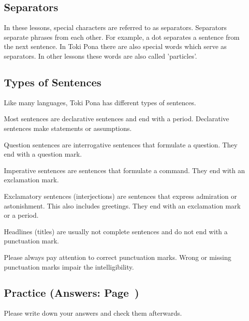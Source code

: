 \subsection*{Separators}
In these lessons, special characters are referred to as separators.
Separators separate phrases from each other.
For example, a dot separates a sentence from the next sentence.
In Toki Pona there are also special words which serve as separators.
In other lessons these words are also called 'particles'.

\subsection*{Types of Sentences}

Like many languages, Toki Pona has different types of sentences.

Most sentences are declarative sentences and end with a period.
Declarative sentences make statements or assumptions.

Question sentences are interrogative sentences that formulate a question.
They end with a question mark.

Imperative sentences are sentences that formulate a command.
They end with an exclamation mark.

Exclamatory sentences (interjections) are sentences that express admiration or astonishment.
This also includes greetings.
They end with an exclamation mark or a period.

Headlines (titles) are usually not complete sentences and do not end with a punctuation mark.

Please always pay attention to correct punctuation marks.
Wrong or missing punctuation marks impair the intelligibility.

\newpage

\subsection*{Practice (Answers: Page~\pageref{'pronunciation_alphabet_answers'})}
Please write down your answers and check them afterwards.

